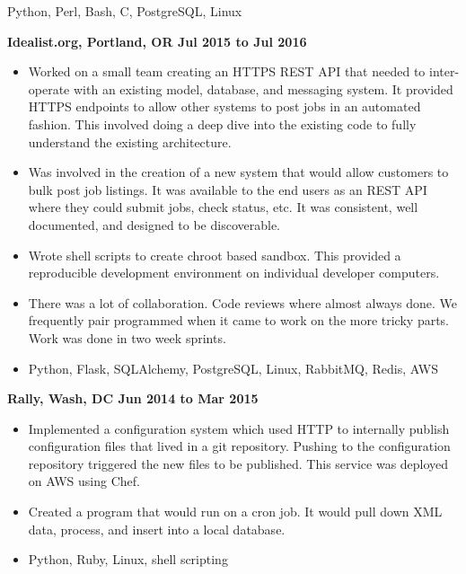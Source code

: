 \documentclass{res}
\begin{document}
\begin{resume}
\begin{itemize}
    Python, Perl, Bash, C, PostgreSQL, Linux

  \end{itemize}

  {\large \bf Idealist.org, Portland, OR \hfill Jul 2015 to Jul 2016}
  \begin{itemize}
    \item
    Worked on a small team creating an HTTPS REST API that needed
    to inter-operate with an existing model, database, and messaging
    system. It provided HTTPS endpoints to allow other systems to post
    jobs in an automated fashion.  This involved doing
    a deep dive into the existing code to fully understand the existing
    architecture.
    \item
    Was involved in the creation of a new system that would allow
    customers to bulk post job listings.  It was available to the end users
    as an REST API where they could submit jobs, check status, etc.
    It was consistent, well documented, and designed to be discoverable.
    \item
    Wrote shell scripts to create chroot based sandbox.  This provided
    a reproducible development environment on individual developer
    computers.
    \item
    There was a lot of collaboration.  Code reviews where almost always
    done.  We frequently pair programmed when it came to work on the
    more tricky parts.  Work was done in two week sprints.
  \item
    Python, Flask, SQLAlchemy, PostgreSQL, Linux, RabbitMQ, Redis, AWS
  \end{itemize}

  {\large \bf Rally, Wash, DC \hfill Jun 2014 to Mar 2015}

  \begin{itemize}

  \item
    Implemented a configuration system which used HTTP to
    internally publish configuration files that lived in a git repository.
    Pushing to the configuration repository triggered the new files
    to be published.  This service was deployed on AWS using Chef.
  \item
    Created a program that would run on a cron job.  It would pull down
    XML data, process, and insert into a local database.
  \item
    Python, Ruby, Linux, shell scripting

  \end{itemize}


\end{resume}
\end{document}
